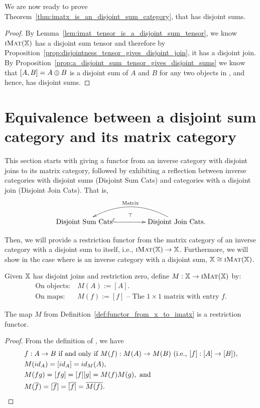 We are now ready to prove Theorem~\ref{thm:imatx_is_an_disjoint_sum_category}, that \imatx has
disjoint sums.

\begin{proof}
  By Lemma~\ref{lem:imat_tensor_is_a_disjoint_sum_tensor}, we know $\textsc{iMat}({\mathbb{X}})$ has a disjoint sum
  tensor and therefore by Proposition~\ref{prop:disjointness_tensor_gives_disjoint_join},
  it has a disjoint join. By Proposition~\ref{prop:a_disjoint_sum_tensor_gives_disjoint_sums}
  we know that $[A,B] = A\oplus B$ is a disjoint sum of $A$ and $B$ for any two objects in \imatx, and
  hence, \imatx has disjoint sums.
\end{proof}

\section{Equivalence between a disjoint sum category and its matrix category} %
\label{sec:equivalence_between_an_disjoint_sum_category_and_its_matrix_category}
This section starts with giving a functor from an inverse category with disjoint joins to its matrix
category, followed by exhibiting a reflection between inverse categories with disjoint sums
(Disjoint Sum Cats) and categories with a disjoint join (Disjoint Join Cats). That is,
\[
   \xymatrix@R+10pt@C+20pt{
     \text{Disjoint Sum Cats} \ar@{^{(}->}[r]
     & \text{Disjoint Join Cats.} \ar@/_1.8pc/[l]_{\text{Matrix}} \ar@{}@<-1ex>[l]_{\top}
   }
\]

Then, we will provide a restriction functor from the matrix category of an inverse category with a
disjoint sum to itself, i.e., $\textsc{iMat}({\mathbb{X}}) \to \mathbb{X}$.  Furthermore, we will show in the case where \X is an
inverse category with a disjoint sum, $\mathbb{X}\cong \textsc{iMat}({\mathbb{X}})$.

\begin{definition}\label{def:functor_from_x_to_imatx}
  Given $\mathbb{X}$ has disjoint joins and restriction zero, define $M:\mathbb{X} \to \textsc{iMat}({\mathbb{X}})$ by:
  \begin{align*}
    \text{On objects:}\ &M(A) := [A].\\
    \text{On maps:}\ &M(f) := [f] \text{ -- The }1\times1\text{ matrix with entry }f.
  \end{align*}
\end{definition}
\begin{lemma}\label{lem:m_is_a_functor}
  The map $M$ from Definition~\ref{def:functor_from_x_to_imatx} is a restriction functor.
\end{lemma}
\begin{proof}
  From the definition of \imatx, we have
  \begin{align*}
    &f: A\to B \text{ if and only if } M(f):M(A)\to M(B)\  (\text{i.e., }[f]: [A]\to [B]),\\
    &M(id_A)  = [id_{A}] = id_M(A),\\
    &M(f g) = [f g] = [f][g] = M(f) M(g),\text{ and}\\
    &M(\overline{f}) = [\overline{f}] = \overline{[f]} = \overline{M(f)}.
  \end{align*}
\end{proof}

